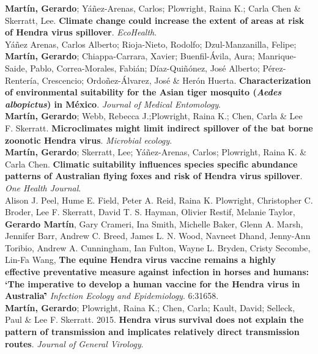 \documentclass[12pt, a4paper]{article}
\newcommand{\years}[1]{\marginnote{\scriptsize #1}}
\begin{document}
\years{2018} \textbf{Mart\'in, Gerardo}; Y\'a\~nez-Arenas, Carlos; Plowright, Raina K.; Carla Chen \& Skerratt, Lee. \textbf{Climate change could increase the extent of areas at risk of Hendra virus spillover}. \emph{EcoHealth}.\\

\years{2017} Y\'a\~nez Arenas, Carlos Alberto; Rioja-Nieto, Rodolfo; Dzul-Manzanilla, Felipe; \textbf{Mart\'in, Gerardo}; Chiappa-Carrara, Xavier; Buenfil-\'Avila, Aura; Manrique-Saide, Pablo, Correa-Morales, Fabi\'an; D\'iaz-Qui\~n\'onez, Jos\'e Alberto; P\'erez-Renter\'ia, Crescencio; Ordo\~nez-\'Alvarez, Jos\'e \& Her\'on Huerta. \textbf{Characterization of environmental suitability for the Asian tiger mosquito (\emph{Aedes albopictus}) in M\'exico}. \emph{Journal of Medical Entomology}.\\

\years{2017} \textbf{Mart\'in, Gerardo}; Webb, Rebecca J.;Plowright, Raina K.; Chen, Carla  \& Lee F. Skerratt. \textbf{Microclimates might limit indirect spillover of the bat borne zoonotic Hendra virus}. \emph{Microbial ecology}.\\

\years{2016} \textbf{Mart\'in, Gerardo}; Skerratt, Lee; Y\'a\~nez-Arenas, Carlos; Plowright, Raina K. \& Carla Chen. \textbf{Climatic suitability influences species specific abundance patterns of Australian flying foxes and risk of Hendra virus spillover}. \emph{One Health Journal}.\\

\years{2016} Alison J. Peel, Hume E. Field, Peter A. Reid, Raina K. Plowright, Christopher C. Broder, Lee F. Skerratt, David T. S. Hayman, Olivier Restif, Melanie Taylor, \textbf{Gerardo Mart\'in}, Gary Crameri, Ina Smith, Michelle Baker, Glenn A. Marsh, Jennifer Barr, Andrew C. Breed, James L. N. Wood, Navneet Dhand, Jenny-Ann Toribio, Andrew A. Cunningham, Ian Fulton, Wayne L. Bryden, Cristy Secombe, Lin-Fa Wang, \textbf{The equine Hendra virus vaccine remains a highly effective preventative measure against infection in horses and humans: \lq The imperative to develop a human vaccine for the Hendra virus in Australia\rq\.} \emph{Infection Ecology and Epidemiology}. {6\bf}:31658.\\

\years{2015} \textbf{Mart\'in, Gerardo}; Plowright, Raina K.; Chen, Carla; Kault, David; Selleck, Paul \& Lee F. Skerratt. 2015. \textbf{Hendra virus survival does not explain the pattern of transmission and implicates relatively direct transmission routes}. \emph{Journal of General Virology}.\\
\end{document}
